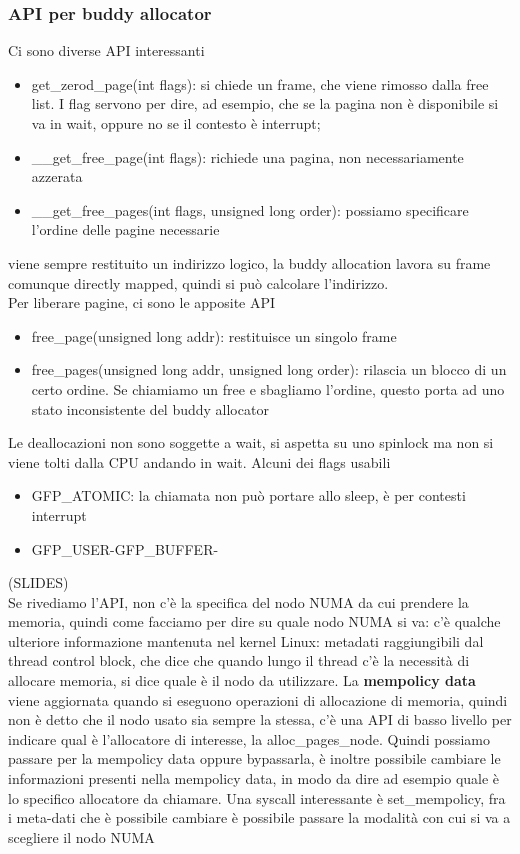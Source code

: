 \documentclass[12pt, oneside]{extbook}
\begin{document}
\subsubsection{API per buddy allocator}
Ci sono diverse API interessanti
\begin{itemize}
\item \textsf{get\_zerod\_page(int flags)}: si chiede un frame, che viene rimosso dalla free list. I flag servono per dire, ad esempio, che se la pagina non è disponibile si va in wait, oppure no se il contesto è interrupt;
\item \textsf{\_\_get\_free\_page(int flags)}: richiede una pagina, non necessariamente azzerata
\item \textsf{\_\_get\_free\_pages(int flags, unsigned long order)}: possiamo specificare l'ordine delle pagine necessarie
\end{itemize}
viene sempre restituito un indirizzo logico, la buddy allocation lavora su frame comunque directly mapped, quindi si può calcolare l'indirizzo.\\ Per liberare pagine, ci sono le apposite API
\begin{itemize}
\item \textsf{free\_page(unsigned long addr)}: restituisce un singolo frame
\item \textsf{free\_pages(unsigned long addr, unsigned long order)}: rilascia un blocco di un certo ordine. Se chiamiamo un free e sbagliamo l'ordine, questo porta ad uno stato inconsistente del buddy allocator
\end{itemize}
Le deallocazioni non sono soggette a wait, si aspetta su uno spinlock ma non si viene tolti dalla CPU andando in wait. Alcuni dei flags usabili
\begin{itemize}
\item \textsf{GFP\_ATOMIC}: la chiamata non può portare allo sleep, è per contesti interrupt
\item \textsf{GFP\_USER-GFP\_BUFFER-}
\end{itemize}
(SLIDES)\\
Se rivediamo l'API, non c'è la specifica del nodo NUMA da cui prendere la memoria, quindi come facciamo per dire su quale nodo NUMA si va: c'è qualche ulteriore informazione mantenuta nel kernel Linux: metadati raggiungibili dal thread control block, che dice che quando lungo il thread c'è la necessità di allocare memoria, si dice quale è il nodo da utilizzare. La \textbf{mempolicy data} viene aggiornata quando si eseguono operazioni di allocazione di memoria, quindi non è detto che il nodo usato sia sempre la stessa, c'è una API di basso livello per indicare qual è l'allocatore di interesse, la \textsf{alloc\_pages\_node}. Quindi possiamo passare per la mempolicy data oppure bypassarla, è inoltre possibile cambiare le informazioni presenti nella mempolicy data, in modo da dire ad esempio quale è lo specifico allocatore da chiamare. Una syscall interessante è \textsf{set\_mempolicy}, fra i meta-dati che è possibile cambiare è possibile passare la modalità con cui si va a scegliere il nodo NUMA
\end{document}
